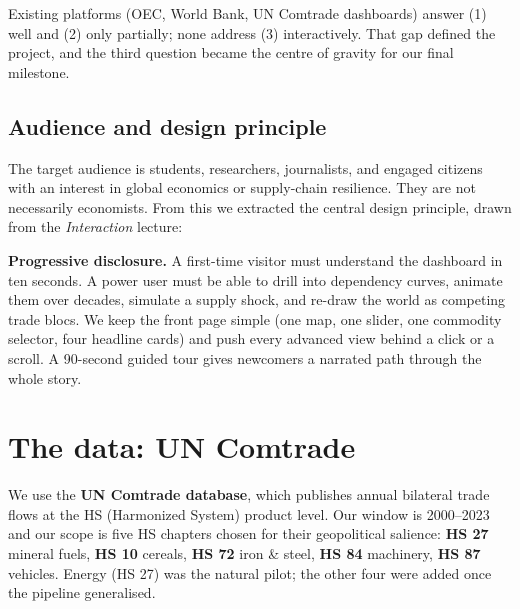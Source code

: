 \documentclass[a4paper,10pt]{article}
\begin{document}
Existing platforms (OEC, World Bank, UN Comtrade dashboards) answer (1) well and
(2) only partially; none address (3) interactively. That gap defined the project,
and the third question became the centre of gravity for our final milestone.

\subsection{Audience and design principle}

The target audience is students, researchers, journalists, and engaged
citizens with an interest in global economics or supply-chain resilience.
They are not necessarily economists. From this we extracted the central
design principle, drawn from the \emph{Interaction} lecture:

\begin{decision}
\textbf{Progressive disclosure.}
A first-time visitor must understand the dashboard in ten seconds. A power user
must be able to drill into dependency curves, animate them over decades, simulate
a supply shock, and re-draw the world as competing trade blocs. We keep the front
page simple (one map, one slider, one commodity selector, four headline cards) and
push every advanced view behind a click or a scroll. A 90-second guided tour gives
newcomers a narrated path through the whole story.
\end{decision}

\section{The data: UN Comtrade}

We use the \textbf{UN Comtrade database}, which publishes annual bilateral trade
flows at the HS (Harmonized System) product level. Our window is 2000--2023 and
our scope is five HS chapters chosen for their geopolitical salience:
\textbf{HS 27} mineral fuels, \textbf{HS 10} cereals, \textbf{HS 72} iron \&
steel, \textbf{HS 84} machinery, \textbf{HS 87} vehicles. Energy (HS 27) was the
natural pilot; the other four were added once the pipeline generalised.
\end{document}
